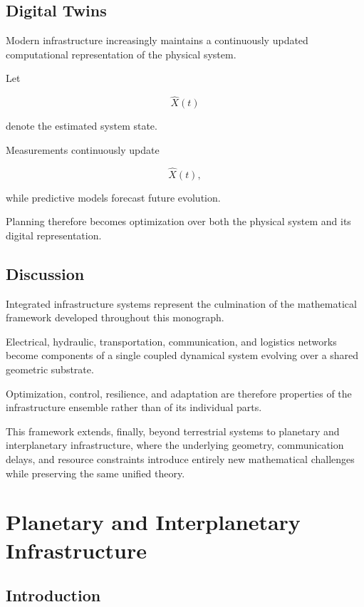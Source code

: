\documentclass[11pt,fleqn]{book}
\numberwithin{equation}{chapter}
\theoremstyle{plain}
\theoremstyle{definition}
\theoremstyle{remark}
\begin{document}

\section{Digital Twins}

Modern infrastructure increasingly maintains a continuously updated
computational representation of the physical system.

Let

\[
\hat X(t)
\]

denote the estimated system state.

Measurements continuously update

\[
\hat X(t),
\]

while predictive models forecast future evolution.

Planning therefore becomes optimization over both the physical system
and its digital representation.


\section{Discussion}

Integrated infrastructure systems represent the culmination of the
mathematical framework developed throughout this monograph.

Electrical,
hydraulic,
transportation,
communication,
and logistics networks become components of a single coupled dynamical
system evolving over a shared geometric substrate.

Optimization,
control,
resilience,
and adaptation are therefore properties of the infrastructure ensemble
rather than of its individual parts.

This framework extends, finally, beyond terrestrial systems
to planetary and interplanetary infrastructure, where the underlying
geometry, communication delays, and resource constraints introduce
entirely new mathematical challenges while preserving the same unified
theory.

\chapter{Planetary and Interplanetary Infrastructure}

\section{Introduction}
\end{document}
